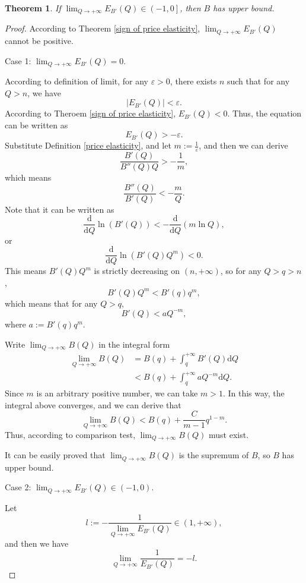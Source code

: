 \documentclass{article}
\newtheorem{theorem}{Theorem}[subsection]
\begin{document}
\begin{theorem}
\label{upper bound of benefit}
If $\lim_{Q\to+\infty}E_{B'}\!\left(Q\right)\in\left(-1,0\right]$, then $B$ has upper bound.
\end{theorem}
\begin{proof}
According to Theorem \ref{sign of price elasticity},
$\lim_{Q\to+\infty}E_{B'}\!\left(Q\right)$ cannot be positive.

Case 1: $\lim_{Q\to+\infty}E_{B'}\!\left(Q\right)=0$.

According to definition of limit, for any $\varepsilon>0$, there exists $n$ such that for any $Q>n$, we have
$$\left|E_{B'}\!\left(Q\right)\right|<\varepsilon.$$
According to Theroem \ref{sign of price elasticity}, $E_{B'}\!\left(Q\right)<0$.
Thus, the equation can be written as
$$E_{B'}\!\left(Q\right)>-\varepsilon.$$
Substitute Definition \ref{price elasticity}, and let $m:=\frac1\varepsilon$, and then we can derive
$$\frac{B'\!\left(Q\right)}{B''\!\left(Q\right)Q}>-\frac1m,$$
which means
$$\frac{B''\!\left(Q\right)}{B'\!\left(Q\right)}<-\frac mQ.$$
Note that it can be written as
$$\frac{\mathrm d}{\mathrm dQ}\ln\!\left(B'\!\left(Q\right)\right)<-\frac{\mathrm d}{\mathrm dQ}\left(m\ln Q\right),$$
or
$$\frac{\mathrm d}{\mathrm dQ}\ln\!\left(B'\!\left(Q\right)Q^m\right)<0.$$
This means $B'\!\left(Q\right)Q^m$ is strictly decreasing on $\left(n,+\infty\right)$,
so for any $Q>q>n$,
$$B'\!\left(Q\right)Q^m<B'\!\left(q\right)q^m,$$
which means that for any $Q>q$,
$$B'\!\left(Q\right)<aQ^{-m},$$
where $a:=B'\!\left(q\right)q^m$.

Write $\lim_{Q\to+\infty}B\!\left(Q\right)$ in the integral form
\begin{align*}
\lim_{Q\to+\infty}B\!\left(Q\right)&=B\!\left(q\right)+\int_q^{+\infty}B'\!\left(Q\right)\mathrm dQ\\
&<B\!\left(q\right)+\int_q^{+\infty}aQ^{-m}\mathrm dQ.
\end{align*}
Since $m$ is an arbitrary positive number, we can take $m>1$.
In this way, the integral above converges, and we can derive that
$$\lim_{Q\to+\infty}B\!\left(Q\right)<B\!\left(q\right)+\frac C{m-1}q^{1-m}.$$
Thus, according to comparison test, $\lim_{Q\to+\infty}B\!\left(Q\right)$ must exist.

It can be easily proved that $\lim_{Q\to+\infty}B\!\left(Q\right)$ is the supremum of $B$, so $B$ has upper bound.

Case 2: $\lim_{Q\to+\infty}E_{B'}\!\left(Q\right)\in\left(-1,0\right)$.

Let
$$l:=-\frac1{\lim_{Q\to+\infty}E_{B'}\!\left(Q\right)}\in\left(1,+\infty\right),$$
and then we have
$$\lim_{Q\to+\infty}\frac1{E_{B'}\!\left(Q\right)}=-l.$$


\end{proof}
\end{document}
